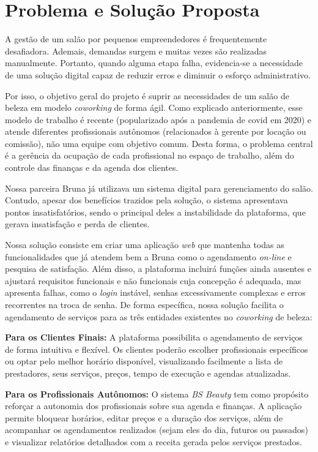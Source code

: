 \section{Problema e Solução Proposta}

A gestão de um salão por pequenos empreendedores é frequentemente desafiadora. Ademais, demandas surgem e muitas vezes são realizadas manualmente. Portanto, quando alguma etapa falha, evidencia‐se a necessidade de uma solução digital capaz de reduzir erros e diminuir o esforço administrativo.

Por isso, o objetivo geral do projeto é suprir as necessidades de um salão de beleza em modelo \emph{coworking} de forma ágil. Como explicado anteriormente, esse modelo de trabalho é recente (popularizado após a pandemia de \gls{covid} em 2020) e atende diferentes profissionais autônomos (relacionados à gerente por locação ou comissão), não uma equipe com objetivo comum. Desta forma, o problema central é a gerência da ocupação de cada profissional no espaço de trabalho, além do controle das finanças e da agenda dos clientes.

Nossa parceira Bruna já utilizava um sistema digital para gerenciamento do salão. Contudo, apesar dos benefícios trazidos pela solução, o sistema apresentava pontos insatisfatórios, sendo o principal deles a instabilidade da plataforma, que gerava insatisfação e perda de clientes.

Nossa solução consiste em criar uma aplicação \emph{web} que mantenha todas as funcionalidades que já atendem bem a Bruna como o agendamento \emph{on-line} e pesquisa de satisfação. Além disso, a plataforma incluirá funções ainda ausentes e ajustará requisitos funcionais e não funcionais cuja concepção é adequada, mas apresenta falhas, como o \emph{login} instável, senhas excessivamente complexas e erros recorrentes na troca de senha. De forma específica, nossa solução facilita o agendamento de serviços para as três entidades existentes no \emph{coworking} de beleza: 

\noindent\textbf{Para os Clientes Finais:} A plataforma possibilita o agendamento de serviços de forma intuitiva e flexível. Os clientes poderão escolher profissionais específicos ou optar pelo melhor horário disponível, visualizando facilmente a lista de prestadores, seus serviços, preços, tempo de execução e agendas atualizadas.

\noindent\textbf{Para os Profissionais Autônomos:} O sistema \emph{BS Beauty} tem como propósito reforçar a autonomia dos profissionais sobre sua agenda e finanças. A aplicação permite bloquear horários, editar preços e a duração dos serviços, além de acompanhar os agendamentos realizados (sejam eles do dia, futuros ou passados) e visualizar relatórios detalhados com a receita gerada pelos serviços prestados.

